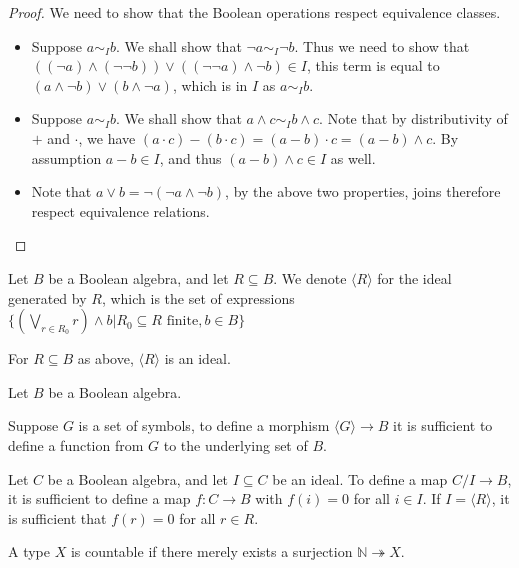 \documentclass{../util/zariski-small}
\begin{document}
\begin{proof}
  We need to show that the Boolean operations respect equivalence classes. 
  \begin{itemize}
    \item 
      Suppose $a \sim_I b$. We shall show that $\neg a \sim_I \neg b$. 
      Thus we need to show that 
      $((\neg a) \wedge (\neg \neg b)) \vee ((\neg \neg a) \wedge \neg b) \in I$, 
      this term is equal to 
      $( a \wedge \neg b) \vee (b \wedge \neg a)$, which is in $I$ as $ a\sim_I b$. 
    \item 
      Suppose $ a\sim _I b $. We shall show that 
      $a \wedge c \sim_I b \wedge c$. 
      Note that by distributivity of $+$ and $\cdot$, we have 
      $(a \cdot c) -( b \cdot c) = (a -b ) \cdot c = (a-b) \wedge c$. 
      By assumption $a -b \in I$, and thus $(a-b) \wedge c \in I$ as well. 
    \item Note that $a \vee b = \neg ( \neg a \wedge \neg b)$, by the above two properties, 
      joins therefore respect equivalence relations. 
  \end{itemize}
\end{proof}
\begin{definition}
  Let $B$ be a Boolean algebra, and let $R\subseteq B$. 
  We denote $\langle R\rangle $ for the ideal generated by $R$, 
  which is the set of expressions 
  $\{(\bigvee_{r \in R_0} r) \wedge b| R_0\subseteq R \text{ finite}, b \in B\}$
\end{definition} 
\begin{remark}
  For $R\subseteq B$ as above, $ \langle R \rangle$ is an ideal.
\end{remark}

\begin{remark}\label{rmkMorphismsOutOfQuotient}
  Let $B$ be a Boolean algebra. 
  
  Suppose $G$ is a set of symbols, to define a morphism 
  $\langle G \rangle \to B$ it is sufficient to define 
  a function from $G$ to the underlying set of $B$. 

  Let $C$ be a Boolean algebra, and let $I\subseteq C$ be an ideal. 
  To define a map $C / I \to B$, it is sufficient to define a map $f:C\to B$
  with $f(i) = 0$ for all $i\in I$. 
  If $I = \langle R\rangle $, it is sufficient that $f(r) = 0$ for all $r\in R$. 
\end{remark}
\begin{definition}
  A type $X$ is countable if there merely exists a surjection 
  $\mathbb N \twoheadrightarrow X$. 
\end{definition}
\end{document}
